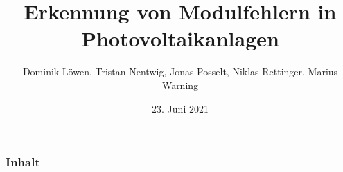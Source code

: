 \documentclass[utf8x, xcolor=dvipsnames]{beamer}
\title[PV Modulfehler]{Erkennung von Modulfehlern in Photovoltaikanlagen} %
\author{Dominik Löwen, Tristan Nentwig, Jonas Posselt, Niklas Rettinger, Marius Warning} %
\institute[FH Bielefeld] %
{
Fachhochschule Bielefeld \\ %
}
\date{23. Juni 2021} %
\begin{document}
\begin{frame}
\titlepage %
\end{frame}

\begin{frame}
\frametitle{Inhalt} %
\setcounter{tocdepth}{1}
\tableofcontents %
\end{frame}






\end{document}

